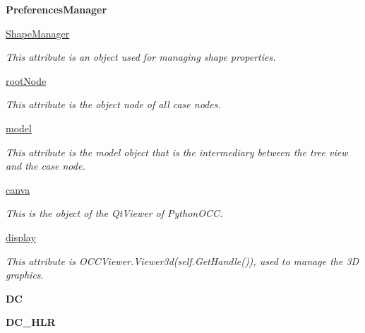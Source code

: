 \begin{DoxyCompactItemize}
{\bfseries Preferences\+Manager}
\item 
\hypertarget{a00081_a1e75ee619926a396b584090b2707b1ca}{}\label{a00081_a1e75ee619926a396b584090b2707b1ca} 
\hyperlink{a00081_a1e75ee619926a396b584090b2707b1ca}{Shape\+Manager}
\begin{DoxyCompactList}\small\item\em This attribute is an object used for managing shape properties. \end{DoxyCompactList}\item 
\hyperlink{a00081_a3cbd742c4a4a706d44d5265e19b25aaa}{root\+Node}
\begin{DoxyCompactList}\small\item\em This attribute is the object node of all case nodes. \end{DoxyCompactList}\item 
\hypertarget{a00081_ac74bebda7bd9e99df8e5d26c0b61e0bb}{}\label{a00081_ac74bebda7bd9e99df8e5d26c0b61e0bb} 
\hyperlink{a00081_ac74bebda7bd9e99df8e5d26c0b61e0bb}{model}
\begin{DoxyCompactList}\small\item\em This attribute is the model object that is the intermediary between the tree view and the case node. \end{DoxyCompactList}\item 
\hypertarget{a00081_ab277fbfb8af6b2ef9aff8d06c9f5cc82}{}\label{a00081_ab277fbfb8af6b2ef9aff8d06c9f5cc82} 
\hyperlink{a00081_ab277fbfb8af6b2ef9aff8d06c9f5cc82}{canva}
\begin{DoxyCompactList}\small\item\em This is the object of the Qt\+Viewer of Python\+O\+CC. \end{DoxyCompactList}\item 
\hyperlink{a00081_abe828f3ea500c70a4abe0f376b6d8dc4}{display}
\begin{DoxyCompactList}\small\item\em This attribute is O\+C\+C\+Viewer.\+Viewer3d(self.\+Get\+Handle()), used to manage the 3D graphics. \end{DoxyCompactList}\item 
\hypertarget{a00081_a8d53bb9fe024d3235652a6233d0d61a8}{}\label{a00081_a8d53bb9fe024d3235652a6233d0d61a8} 
{\bfseries DC}
\item 
\hypertarget{a00081_a62af2479e8c1b0d3405a6122ea2be116}{}\label{a00081_a62af2479e8c1b0d3405a6122ea2be116} 
{\bfseries D\+C\+\_\+\+H\+LR}
\item 
\hypertarget{a00081_a04f16a810669c721b389767d47c08c8f}{}\label{a00081_a04f16a810669c721b389767d47c08c8f} 

\end{DoxyCompactItemize}
